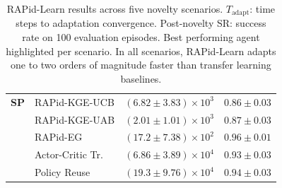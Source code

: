\begin{table}[htbp]
\begin{tabular}{l l c c}
\midrule
\textbf{SP}
  & RAPid-KGE-UCB     & $(6.82 \pm 3.83) \times 10^3$ & $0.86 \pm 0.03$ \\
  & RAPid-KGE-UAB     & $(2.01 \pm 1.01) \times 10^3$ & $0.87 \pm 0.03$ \\
  & RAPid-EG          & $(17.2 \pm 7.38) \times 10^2$ & $0.96 \pm 0.01$ \\
  & Actor-Critic Tr.  & $(6.86 \pm 3.89) \times 10^4$ & $0.93 \pm 0.03$ \\
  & Policy Reuse      & $(19.3 \pm 9.76) \times 10^4$ & $0.94 \pm 0.03$ \\
\bottomrule
\end{tabular}
\caption{RAPid-Learn results across five novelty scenarios. $T_\text{adapt}$: time steps to adaptation convergence. Post-novelty SR: success rate on 100 evaluation episodes. Best performing agent highlighted per scenario. In all scenarios, RAPid-Learn adapts one to two orders of magnitude faster than transfer learning baselines.}
\label{tab:rapid_learn_results}
\end{table}

